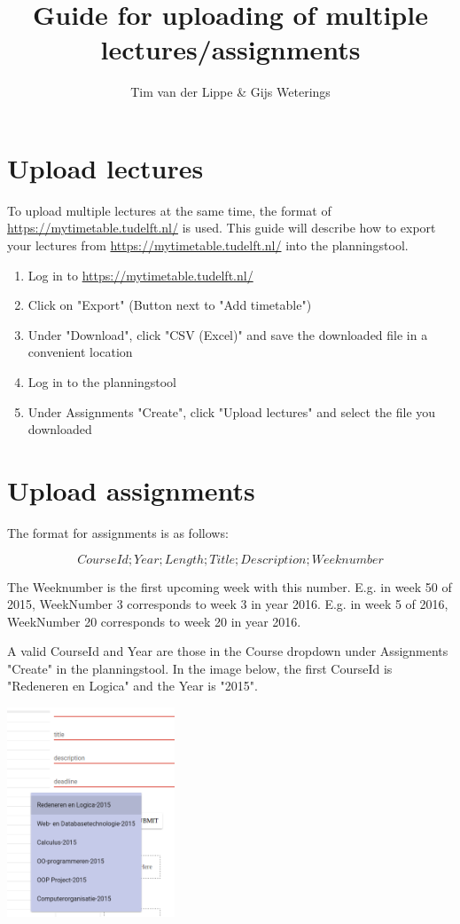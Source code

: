 \documentclass[a4paper,12pt]{article}
\begin{document}
\title{Guide for uploading of multiple lectures/assignments}
\author{Tim van der Lippe \& Gijs Weterings}
\maketitle

\newpage

\section{Upload lectures}

To upload multiple lectures at the same time, the format of \url{https://mytimetable.tudelft.nl/} is used.
This guide will describe how to export your lectures from \url{https://mytimetable.tudelft.nl/} into the planningstool.

\begin{enumerate}
  \item Log in to \url{https://mytimetable.tudelft.nl/}

  \item Click on "Export" (Button next to "Add timetable")

  \item Under "Download", click "CSV (Excel)" and save the downloaded file in a convenient location

  \item Log in to the planningstool

  \item Under Assignments "Create", click "Upload lectures" and select the file you downloaded

\end{enumerate}

\section{Upload assignments}

The format for assignments is as follows:

\[CourseId;Year;Length;Title;Description;Weeknumber\]

The Weeknumber is the first upcoming week with this number.
E.g. in week 50 of 2015, WeekNumber 3 corresponds to week 3 in year 2016.
E.g. in week 5 of 2016, WeekNumber 20 corresponds to week 20 in year 2016.

A valid CourseId and Year are those in the Course dropdown under Assignments "Create" in the planningstool.
In the image below, the first CourseId is "Redeneren en Logica" and the Year is "2015".

\includegraphics[width=5cm]{courses.png}
\end{document}
